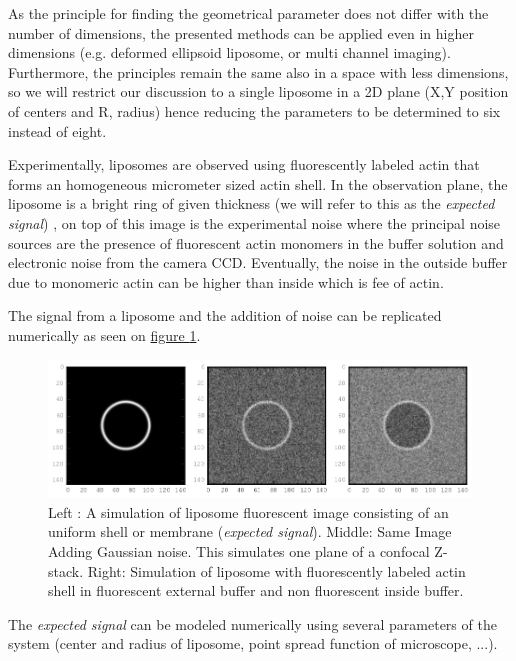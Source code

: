 \documentclass[A4paperpaper,11pt,english]{sphinxmanual}
\begin{document}
As the principle for finding the geometrical parameter does not differ with the
number of dimensions, the presented methods can be applied even in higher dimensions (e.g. deformed
ellipsoid liposome, or multi channel imaging). Furthermore, the principles remain the same also in a
space with less dimensions, so we will restrict our discussion to a single liposome
in a 2D plane (X,Y position of centers and R, radius) hence reducing the parameters to be determined to six instead of eight.

Experimentally, liposomes are observed using fluorescently labeled actin that
forms an homogeneous micrometer sized actin shell. In the observation plane,
the liposome is a bright ring of given thickness (we will refer to this as the
\emph{expected signal}) , on top of this image is the experimental noise where the
principal noise sources are the presence of fluorescent actin monomers in the
buffer solution and electronic noise from the camera CCD. Eventually, the noise
in the outside buffer due to monomeric actin can be higher than inside which is
fee of actin.

The signal from a liposome and the addition of noise can be replicated
numerically as seen on  \hyperref[parts/part4:fig-2d-sim]{figure  \ref*{parts/part4:fig-2d-sim}}.
\begin{figure}[htbp]
\centering
\capstart

\includegraphics{modl-2D-doublet.png}
\caption{Left : A simulation of liposome fluorescent image consisting of an uniform shell or membrane
(\emph{expected signal}).  Middle: Same Image Adding Gaussian noise. This simulates
one plane of a confocal Z-stack.  Right: Simulation of liposome with
fluorescently labeled actin shell in fluorescent external buffer and non
fluorescent inside buffer.}\label{parts/part4:fig-2d-sim}\end{figure}

The \emph{expected signal} can be modeled numerically using several parameters of
the system (center and radius of liposome, point spread function of microscope,
...).
\end{document}
